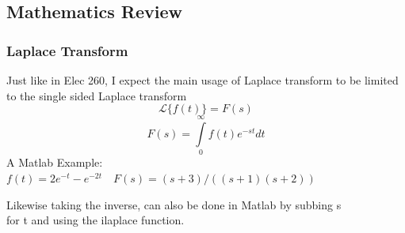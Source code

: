 \documentclass{beamer}
\begin{document}
\subsection{Mathematics Review}
\begin{frame}
\frametitle{Laplace Transform}
Just like in Elec 260, I expect the main usage of Laplace transform to be limited to the single sided Laplace transform
$$\mathscr{L}\{f(t)\}=F(s)$$
$$ F(s) = \int\limits_0^\infty {f(t)e^{ - st} dt}$$
A Matlab Example: $f(t)=2e^{-t}-e^{-2t} \quad F(s)=(s+3)/((s+1)(s+2))$

Likewise taking the inverse, can also be done in Matlab by subbing s \\
 for t and using the ilaplace function.
\end{frame}
\end{document}
